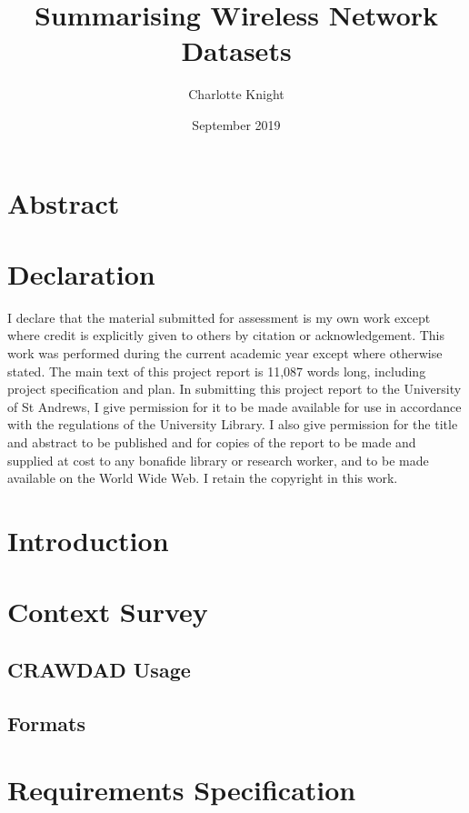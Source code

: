 \documentclass{article}
\title{Summarising Wireless Network Datasets}
\author{Charlotte Knight}
\date{September 2019}
\begin{document}
\maketitle

\section*{Abstract}

\label{section:abst}
\newpage
\section*{Declaration}
I declare that the material submitted for assessment is my own work except where credit is explicitly given to others by citation or acknowledgement. This work was performed during the current academic year except where otherwise stated. 
The main text of this project report is 11,087 words long, including project specification and plan. 
In submitting this project report to the University of St Andrews, I give permission for it to be made available for use in accordance with the regulations of the University Library. I also give permission for the title and abstract to be published and for copies of the report to be made and supplied at cost to any bonafide library or research worker, and to be made available on the World Wide Web. I retain the copyright in this work.

\newpage
\tableofcontents
\newpage

\section{Introduction}
\label{section:intro}


\section{Context Survey}
\label{section:context}
    \subsection{CRAWDAD Usage}
    \label{section:useage}
    
    
    \subsection{Formats}
    \label{section:formats}
    

\section{Requirements Specification}
\label{section:req}

\end{document}
